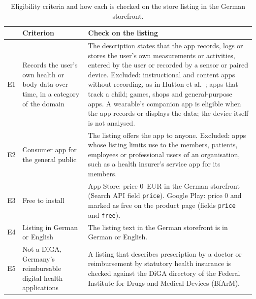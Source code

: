\begin{table}[p]
\begin{singlespace}
\vspace{3\baselineskip}
\caption{Eligibility criteria and how each is checked on the store listing in
the German storefront.}
\label{tab:eligibility}
\setlength{\aboverulesep}{0.4ex}\setlength{\belowrulesep}{0.65ex}
\begin{tabularx}{\textwidth}{@{}l>{\raggedright\arraybackslash}p{3.6cm}>{\raggedright\arraybackslash}X@{}}
\toprule
 & \textbf{Criterion} & \textbf{Check on the listing} \\
\midrule
E1 & Records the user's own health or body data over time, in a category of the
  domain~\parencite{robillard2019availability,malki2024exploring}
  & The description states that the app records, logs or stores the user's own
  measurements or activities, entered by the user or recorded by a sensor or
  paired device. Excluded: instructional and content apps without recording, as
  in Hutton et al.~\parencite{hutton2018assessing}; apps that track a child;
  games, shops and general-purpose apps. A wearable's companion app is eligible
  when the app records or displays the data; the device itself is not analysed. \\
\addlinespace
E2 & Consumer app for the general public
  & The listing offers the app to anyone. Excluded: apps whose listing limits use
  to the members, patients, employees or professional users of an organisation,
  such as a health insurer's service app for its members. \\
\addlinespace
E3 & Free to install
  & App Store: price 0~EUR in the German storefront (Search API field
  \texttt{price}). Google Play: price 0 and marked as free on the product page
  (fields \texttt{price} and \texttt{free}). \\
\addlinespace
E4 & Listing in German or English
  & The listing text in the German storefront is in German or English. \\
\addlinespace
E5 & Not a DiGA, Germany's reimbursable digital health applications
  & A listing that describes prescription by a doctor or reimbursement by
  statutory health insurance is checked against the DiGA directory of the
  Federal Institute for Drugs and Medical Devices (BfArM). \\
\bottomrule
\end{tabularx}
\end{singlespace}
\end{table}

